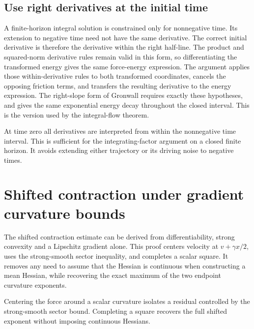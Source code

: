 \documentclass[11pt,a4paper]{report}
\begin{document}
\subsection{\texorpdfstring{Use right derivatives at the initial time}{Use right derivatives at the initial time}}
\label{report-step-KineticLangevin-PotentialContraction-lean-6}


A finite-horizon integral solution is constrained only for nonnegative time. Its extension to negative time need not have the same derivative. The correct initial derivative is therefore the derivative within the right half-line. The product and squared-norm derivative rules remain valid in this form, so differentiating the transformed energy gives the same force-energy expression. The argument applies those within-derivative rules to both transformed coordinates, cancels the opposing friction terms, and transfers the resulting derivative to the energy expression. The right-slope form of Gronwall requires exactly these hypotheses, and gives the same exponential energy decay throughout the closed interval. This is the version used by the integral-flow theorem.



At time zero all derivatives are interpreted from within the nonnegative time interval. This is sufficient for the integrating-factor argument on a closed finite horizon. It avoids extending either trajectory or its driving noise to negative times.

\section{\texorpdfstring{Shifted contraction under gradient curvature bounds}{Shifted contraction under gradient curvature bounds}}
\label{proof-module-KineticLangevin-GeneralContraction-lean}


The shifted contraction estimate can be derived from differentiability, strong convexity and a Lipschitz gradient alone. This proof centers velocity at \(v+\gamma x/2\), uses the strong-smooth sector inequality, and completes a scalar square. It removes any need to assume that the Hessian is continuous when constructing a mean Hessian, while recovering the exact maximum of the two endpoint curvature exponents.



Centering the force around a scalar curvature isolates a residual controlled by the strong-smooth sector bound. Completing a square recovers the full shifted exponent without imposing continuous Hessians.
\end{document}
